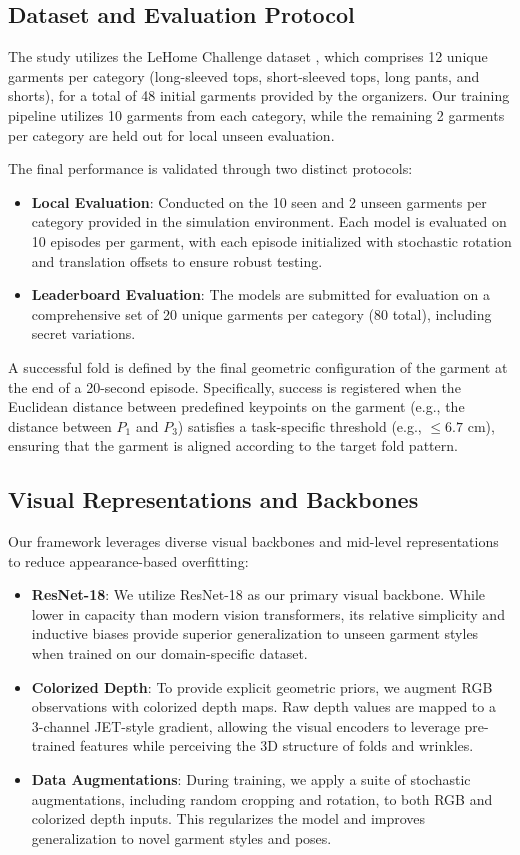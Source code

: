 \subsection{Dataset and Evaluation Protocol}
The study utilizes the LeHome Challenge dataset \cite{lehome2026}, which comprises 12 unique garments per category (long-sleeved tops, short-sleeved tops, long pants, and shorts), for a total of 48 initial garments provided by the organizers. Our training pipeline utilizes 10 garments from each category, while the remaining 2 garments per category are held out for local unseen evaluation. 

The final performance is validated through two distinct protocols:
\begin{itemize}[leftmargin=*,noitemsep]
    \item \textbf{Local Evaluation}: Conducted on the 10 seen and 2 unseen garments per category provided in the simulation environment. Each model is evaluated on 10 episodes per garment, with each episode initialized with stochastic rotation and translation offsets to ensure robust testing.
    \item \textbf{Leaderboard Evaluation}: The models are submitted for evaluation on a comprehensive set of 20 unique garments per category (80 total), including secret variations.
\end{itemize}

A successful fold is defined by the final geometric configuration of the garment at the end of a 20-second episode. Specifically, success is registered when the Euclidean distance between predefined keypoints on the garment (e.g., the distance between $P_1$ and $P_3$) satisfies a task-specific threshold (e.g., $\le 6.7$ cm), ensuring that the garment is aligned according to the target fold pattern.


\subsection{Visual Representations and Backbones}
Our framework leverages diverse visual backbones and mid-level representations to reduce appearance-based overfitting:
\begin{itemize}[leftmargin=*,noitemsep]
    \item \textbf{ResNet-18}: We utilize ResNet-18 \cite{he2015deepresiduallearningimage} as our primary visual backbone. While lower in capacity than modern vision transformers, its relative simplicity and inductive biases provide superior generalization to unseen garment styles when trained on our domain-specific dataset.
    \item \textbf{Colorized Depth}: To provide explicit geometric priors, we augment RGB observations with colorized depth maps. Raw depth values are mapped to a 3-channel JET-style gradient, allowing the visual encoders to leverage pre-trained features while perceiving the 3D structure of folds and wrinkles.
    \item \textbf{Data Augmentations}: During training, we apply a suite of stochastic augmentations, including random cropping and rotation, to both RGB and colorized depth inputs. This regularizes the model and improves generalization to novel garment styles and poses.
\end{itemize}
